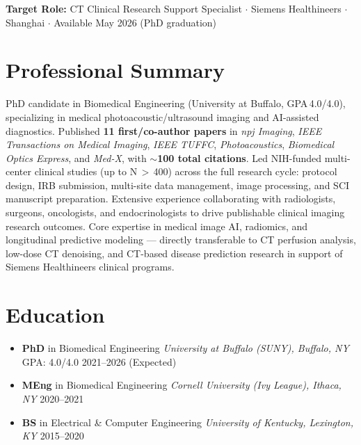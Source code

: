 \documentclass[letterpaper,10pt]{article}
\begin{document}
\begin{center}
  \small
  \textbf{Target Role:} CT Clinical Research Support Specialist $\cdot$ Siemens Healthineers $\cdot$ Shanghai $\cdot$
  Available May 2026 (PhD graduation)
\end{center}

\vspace{-2pt}

\section{Professional Summary}

PhD candidate in Biomedical Engineering (University at Buffalo, GPA\,4.0/4.0), specializing in medical
photoacoustic/ultrasound imaging and AI-assisted diagnostics. Published \textbf{11 first/co-author papers}
in \textit{npj Imaging}, \textit{IEEE Transactions on Medical Imaging}, \textit{IEEE TUFFC},
\textit{Photoacoustics}, \textit{Biomedical Optics Express}, and \textit{Med-X}, with $\sim$\textbf{100 total citations}.
Led NIH-funded multi-center clinical studies (up to N\,$>$\,400) across the full research cycle:
protocol design, IRB submission, multi-site data management, image processing, and SCI manuscript preparation.
Extensive experience collaborating with radiologists, surgeons, oncologists, and endocrinologists to drive
publishable clinical imaging research outcomes. Core expertise in medical image AI, radiomics, and
longitudinal predictive modeling — directly transferable to CT perfusion analysis, low-dose CT denoising,
and CT-based disease prediction research in support of Siemens Healthineers clinical programs.

\vspace{-2pt}

\section{Education}

\begin{itemize}[leftmargin=0.0in, label={}, itemsep=2pt, topsep=2pt]
  \item \textbf{PhD} in Biomedical Engineering \hfill \textit{University at Buffalo (SUNY), Buffalo, NY} \hfill GPA: 4.0/4.0 \hfill 2021--2026 (Expected)
  \item \textbf{MEng} in Biomedical Engineering \hfill \textit{Cornell University (Ivy League), Ithaca, NY} \hfill 2020--2021
  \item \textbf{BS} in Electrical \& Computer Engineering \hfill \textit{University of Kentucky, Lexington, KY} \hfill 2015--2020
\end{itemize}
\end{document}
